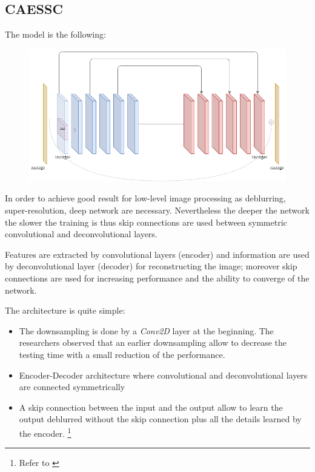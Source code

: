 \subsection{CAESSC}
The model is the following:
\begin{figure}[H]
    \centering
    \includegraphics[scale=0.4]{subsections/caessc/caessc.png}
\end{figure}

In order to achieve good result for low-level image processing as deblurring, super-resolution, deep network are necessary.
Nevertheless the deeper the network the slower the training is thus skip connections are used between symmetric convolutional and deconvolutional layers.

Features are extracted by convolutional layers (encoder) and information are used by deconvolutional layer (decoder) for reconstructing the image; moreover skip connections are used for increasing performance and the ability to converge of the network.

The architecture is quite simple:
\begin{itemize}
    \item The downsampling is done by a \textit{Conv2D} layer at the beginning.
    The researchers observed that an earlier downsampling allow to decrease the testing time with a small reduction of the performance.
    \item Encoder-Decoder architecture where convolutional and deconvolutional layers are connected symmetrically
    \item A skip connection between the input and the output allow to learn the output deblurred without the skip connection plus all the details learned by the encoder. \footnote{Refer to \cite[4.1 Analysis of the architecture]{CAESSC}} 
\end{itemize}

